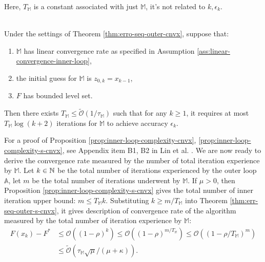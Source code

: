 \documentclass[12pt]{article}
\begin{document}
            \begin{remark}
                Here, $T_{\mathbb M}$ is a constant associated with just $\mathbb M$, it's not related to $k, \epsilon_k$. 
            \end{remark}
            \begin{proposition}\label{prop:inner-loop-complexity-cnvx}\;\\
                Under the settings of Theorem \ref{thm:erro-seq-outer-cnvx}, suppose that:
                \begin{enumerate}
                    \item $\mathbb M$ has linear convergence rate as specified in Assumption \ref{ass:linear-convergence-inner-loop}, 
                    \item the initial guess for $\mathbb M$ is $z_{0, k} = x_{k - 1}$, 
                    \item $F$ has bounded level set.
                \end{enumerate}
                Then there exists $T_{\mathbb M} \le \widetilde{\mathcal O}(1 / \tau_{\mathbb M})$ such that for any $k \ge 1$, it requires at most\\ $T_{\mathbb M}\log(k + 2)$ iterations for $\mathbb M$ to achieve accuracy $\epsilon_k$.    
            \end{proposition}
            For a proof of Proposition \ref{prop:inner-loop-complexity-cnvx}, \ref{prop:inner-loop-complexity-s-cnvx}, see Appendix item B1, B2 in Lin et al. \cite{lin_universal_2015}. 
            We are now ready to derive the convergence rate measured by the number of total iteration experience by $\mathbb M$. 
            Let $k \in \mathbb N$ be the total number of iterations experienced by the outer loop $\mathbb A$, let $m$ be the total number of iterations underwent by $\mathbb M$. 
            If $\mu > 0$, then Proposition \ref{prop:inner-loop-complexity-s-cnvx} gives the total number of inner iteration upper bound: $m \le T_{\mathbb M}k$. 
            Substituting $k \ge m/T_{\mathbb M}$ into Theorem \ref{thm:err-seq-outer-s-cnvx}, it gives description of convergence rate of the algorithm measured by the total number of iteration experience by $\mathbb M$: 
            \begin{align*}
                F(x_k) - F^* &\le \mathcal O \left(
                    (1 - \rho)^k 
                \right) \le 
                \mathcal O \left(
                    (1 - \rho)^{m/ T_{\mathbb M}}
                \right) \le 
                \mathcal O\left(
                    \left(1 - \rho/T_{\mathbb M}\right)^{m}
                \right)
                \\
                &\le \widetilde{\mathcal O}\left(
                    \tau_{\mathbb M}\sqrt{\mu}/(\mu + \kappa)
                \right). 
            \end{align*}
\end{document}
